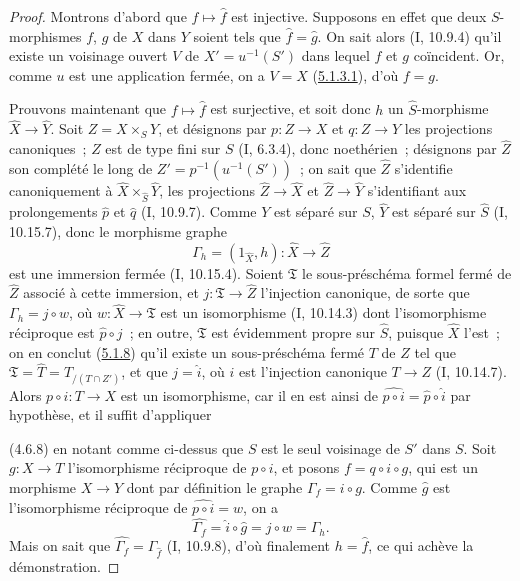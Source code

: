 \begin{proof}
Montrons d'abord que $f\mapsto\widehat f$ est injective. Supposons en effet que deux
$S$-morphismes $f$, $g$ de $X$ dans $Y$ soient tels que $\widehat f=\widehat g$.
On sait alors (I, 10.9.4) qu'il existe un voisinage ouvert $V$ de
$X'=u^{-1}(S')$ dans lequel $f$ et $g$ coïncident. Or, comme $u$ est une application
fermée, on a $V=X$ (\hyperref[III.5.1.3.1-fr]{5.1.3.1}), d'où $f=g$.

Prouvons maintenant que $f\mapsto\widehat f$ est surjective, et soit donc $h$ un
$\widehat S$-morphisme $\widehat X\to\widehat Y$. Soit $Z=X\times_S Y$, et
désignons par $p:Z\to X$ et $q:Z\to Y$ les projections canoniques~; $Z$ est de
type fini sur $S$ (I, 6.3.4), donc noethérien~; désignons par $\widehat Z$ son
complété le long de $Z'=p^{-1}(u^{-1}(S'))$~; on sait que $\widehat Z$ s'identifie
canoniquement à $\widehat X\times_{\widehat S}\widehat Y$, les projections
$\widehat Z\to\widehat X$ et $\widehat Z\to\widehat Y$ s'identifiant aux
prolongements $\widehat p$ et $\widehat q$ (I, 10.9.7). Comme $Y$ est séparé sur
$S$, $\widehat Y$ est séparé sur $\widehat S$ (I, 10.15.7), donc le morphisme
graphe
\[
\Gamma_h=(1_{\widehat X},h):\widehat X\to\widehat Z
\]
est une immersion fermée (I, 10.15.4). Soient $\mathfrak T$ le sous-préschéma
formel fermé de $\widehat Z$ associé à cette immersion, et
$j:\mathfrak T\to\widehat Z$ l'injection canonique, de sorte que
$\Gamma_h=j\circ w$, où $w:\widehat X\to\mathfrak T$ est un isomorphisme
(I, 10.14.3) dont l'isomorphisme réciproque est $\widehat p\circ j$~; en outre,
$\mathfrak T$ est évidemment propre sur $\widehat S$, puisque $\widehat X$ l'est~;
on en conclut (\hyperref[III.5.1.8-fr]{5.1.8}) qu'il existe un sous-préschéma
fermé $T$ de $Z$ tel que
$\mathfrak T=\widehat T=T_{/(T\cap Z')}$, et que $j=\widehat i$, où $i$ est
l'injection canonique $T\to Z$ (I, 10.14.7). Alors $p\circ i:T\to X$ est un
isomorphisme, car il en est ainsi de
$\widehat{p\circ i}=\widehat p\circ\widehat i$ par hypothèse, et il suffit
d'appliquer


(4.6.8) en notant comme ci-dessus que $S$ est le seul voisinage de $S'$ dans $S$.
Soit $g:X\to T$ l'isomorphisme réciproque de $p\circ i$, et posons
$f=q\circ i\circ g$, qui est un morphisme $X\to Y$ dont par définition le graphe
$\Gamma_f=i\circ g$. Comme $\widehat g$ est l'isomorphisme réciproque de
$\widehat{p\circ i}=w$, on a
\[
\widehat{\Gamma_f}=\widehat i\circ\widehat g=j\circ w=\Gamma_h.
\]
Mais on sait que $\widehat{\Gamma_f}=\Gamma_{\widehat f}$ (I, 10.9.8), d'où
finalement $h=\widehat f$, ce qui achève la démonstration.
\end{proof}

